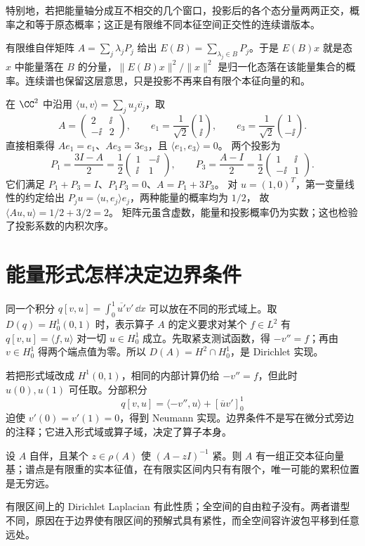 特别地，若把能量轴分成互不相交的几个窗口，投影后的各个态分量两两正交，概率之和等于原态概率；这正是有限维不同本征空间正交性的连续谱版本。

有限维自伴矩阵 \(A=\sum_j\lambda_jP_j\) 给出 \(E(B)=\sum_{\lambda_j\in B}P_j\)。于是 \(E(B)x\) 就是态 \(x\) 中能量落在 \(B\) 的分量，\(\|E(B)x\|^2/\|x\|^2\) 是归一化态落在该能量集合的概率。连续谱也保留这层意思，只是投影不再来自有限个本征向量的和。

\begin{workedexample}[含复数矩阵元的谱投影]
在 $\CC^2$ 中沿用 $\langle u,v\rangle=\sum_j u_j\overline{v_j}$，取
\[
A=\begin{pmatrix}2&\ii\\-\ii&2\end{pmatrix},\qquad
e_1=\frac1{\sqrt2}\binom1\ii,\qquad
e_3=\frac1{\sqrt2}\binom1{-\ii}.
\]
直接相乘得 $Ae_1=e_1$、$Ae_3=3e_3$，且 $\langle e_1,e_3\rangle=0$。
两个投影为
\[
P_1=\frac{3I-A}{2}=\frac12\begin{pmatrix}1&-\ii\\\ii&1\end{pmatrix},
\qquad
P_3=\frac{A-I}{2}=\frac12\begin{pmatrix}1&\ii\\-\ii&1\end{pmatrix}.
\]
它们满足 $P_1+P_3=I$、$P_1P_3=0$、$A=P_1+3P_3$。
对 $u=(1,0)^T$，第一变量线性的约定给出
$P_ju=\langle u,e_j\rangle e_j$，两种能量的概率均为 $1/2$，
故 $\langle Au,u\rangle=1/2+3/2=2$。
矩阵元虽含虚数，能量和投影概率仍为实数；这也检验了投影系数的内积次序。
\end{workedexample}





\section{能量形式怎样决定边界条件}

同一个积分 \(q[v,u]=\int_0^1\overline{u'}v'\,\dd x\) 可以放在不同的形式域上。取 \(D(q)=H_0^1(0,1)\) 时，表示算子 \(A\) 的定义要求对某个 \(f\in L^2\) 有 \(q[v,u]=\langle f,u\rangle\) 对一切 \(u\in H_0^1\) 成立。先取紧支测试函数，得 \(-v''=f\)；再由 \(v\in H_0^1\) 得两个端点值为零。所以 \(D(A)=H^2\cap H_0^1\)，是 Dirichlet 实现。

若把形式域改成 \(H^1(0,1)\)，相同的内部计算仍给 \(-v''=f\)，但此时 \(u(0),u(1)\) 可任取。分部积分
\[
q[v,u]=\langle -v'',u\rangle+[\overline u v']_0^1
\]
迫使 \(v'(0)=v'(1)=0\)，得到 Neumann 实现。边界条件不是写在微分式旁边的注释；它进入形式域或算子域，决定了算子本身。

\begin{theorem}[紧预解式的谱结论]
设 \(A\) 自伴，且某个 \(z\in\rho(A)\) 使 \((A-zI)^{-1}\) 紧。则 \(A\) 有一组正交本征向量基；谱点是有限重的实本征值，在有限实区间内只有有限个，唯一可能的累积位置是无穷远。
\end{theorem}

有限区间上的 Dirichlet Laplacian 有此性质；全空间的自由粒子没有。两者谱型不同，原因在于边界使有限区间的预解式具有紧性，而全空间容许波包平移到任意远处。
